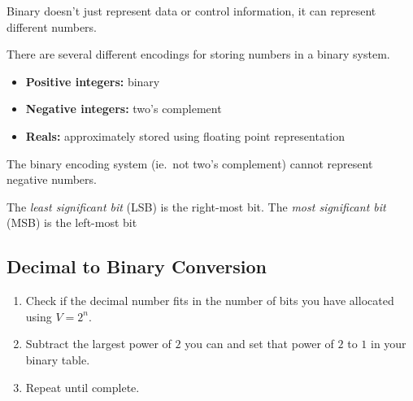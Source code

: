 Binary doesn't just represent data or control information, it can represent different numbers.

There are several different encodings for storing numbers in a binary system.
\begin{itemize}
	\item \textbf{Positive integers:} binary
	\item \textbf{Negative integers:} two's complement
	\item \textbf{Reals:} approximately stored using floating point representation
\end{itemize}

\begin{note}
	The binary encoding system (ie.\ not two's complement) cannot represent negative numbers.
\end{note}
The \emph{least significant bit} (LSB) is the right-most bit.
The \emph{most significant bit} (MSB) is the left-most bit

\subsection{Decimal to Binary Conversion}\label{sub:decimal_to_binary_conversion}

\begin{enumerate}
	\item Check if the decimal number fits in the number of bits you have allocated using \(V=2^n\).
	\item Subtract the largest power of \(2\) you can and set that power of \(2\) to \(1\) in your binary table.
	\item Repeat until complete.
\end{enumerate}
